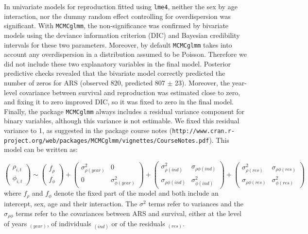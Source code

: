 In univariate models for reproduction fitted using \verb+lme4+, neither the sex by age interaction, nor the dummy random effect controlling for overdispersion was significant. With \verb+MCMCglmm+, the non-significance was confirmed by bivariate models using the deviance information criterion (DIC) and Bayesian credibility intervals for these two parameters. Moreover, by default \verb+MCMCglmm+ takes into account any overdispersion in a distribution assumed to be Poisson. Therefore we did not include these two explanatory variables in the final model. Posterior predictive checks revealed that the bivariate model correctly predicted the number of zeros for ARS (observed 820, predicted 807 $\pm$ 23). Moreover, the year-level covariance between survival and reproduction was estimated close to zero, and fixing it to zero improved DIC, so it was fixed to zero in the final model. Finally, the package \verb+MCMCglmm+ always includes a residual variance component for binary variables, although this variance is not estimable. We fixed this residual variance to 1, as suggested in the package course notes ({\footnotesize\verb+http://www.cran.r-project.org/web/packages/MCMCglmm/vignettes/CourseNotes.pdf+}).
This model can be written as:

\begin{equation*}
	\begin{pmatrix}
	\rho_{i,t}\\
	\phi_{i,t}
		\end{pmatrix}
		\sim	
	\begin{pmatrix}
	f_{\rho}\\
	f_{\phi}
	\end{pmatrix}	
	+
	\begin{pmatrix}
	\sigma_{\rho (year)}^2 & 0\\
	0 & \sigma_{\phi (year)}^2
	\end{pmatrix}	
	+
	\begin{pmatrix}
	\sigma_{\rho (ind)}^2 & \sigma_{\rho \phi (ind)}\\
	\sigma_{\rho \phi (ind)} & \sigma_{\phi (ind)}^2
	\end{pmatrix}	
	+
	\begin{pmatrix}
	\sigma_{\rho (res)}^2 & \sigma_{\rho \phi (res)}\\
	\sigma_{\rho \phi (res)} & \sigma_{\phi (res)}^2
	\end{pmatrix}	
\end{equation*}
where $f_{\rho}$ and $f_{\phi}$ denote the fixed part of the model and both include an intercept, sex, age and their interaction. The $\sigma^2$ terms refer to variances and the $\sigma_{\rho \phi}$ terms refer to the covariances between ARS and survival, either at the level of years $_{(year)}$, of individuals $_{(ind)}$ or of the residuals $_{(res)}$.


